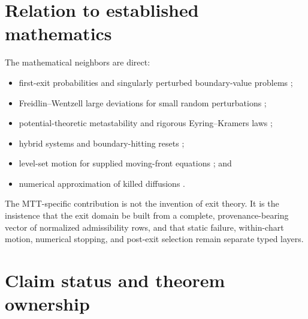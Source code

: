 \documentclass[11pt]{article}
\theoremstyle{definition}
\theoremstyle{remark}
\begin{document}
\section{Relation to established mathematics}
\label{sec:literature}

The mathematical neighbors are direct:
\begin{itemize}
\item first-exit probabilities and singularly perturbed boundary-value
      problems \cite{MatkowskySchuss1977};
\item Freidlin--Wentzell large deviations for small random perturbations
      \cite{FreidlinWentzell2012};
\item potential-theoretic metastability and rigorous Eyring--Kramers laws
      \cite{BovierEtAl2004,Berglund2013};
\item hybrid systems and boundary-hitting resets
      \cite{GoebelSanfeliceTeel2012,BectBailiFleury2005};
\item level-set motion for supplied moving-front equations
      \cite{OsherSethian1988}; and
\item numerical approximation of killed diffusions
      \cite{Gobet2000}.
\end{itemize}

The MTT-specific contribution is not the invention of exit theory.  It is
the insistence that the exit domain be built from a complete,
provenance-bearing vector of normalized admissibility rows, and that
static failure, within-chart motion, numerical stopping, and post-exit
selection remain separate typed layers.

\section{Claim status and theorem ownership}
\label{sec:status}
\end{document}
